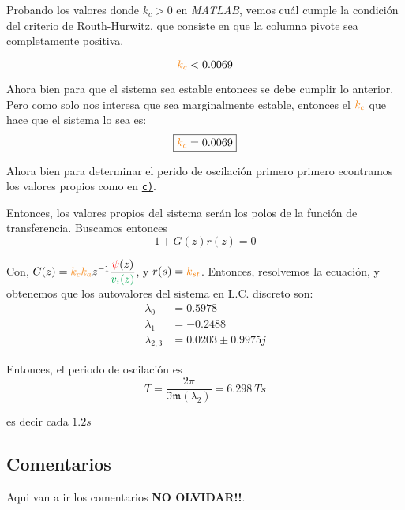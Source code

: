Probando los valores donde \( k_c > 0 \) en \textit{MATLAB}, vemos cuál cumple la condición del criterio de Routh-Hurwitz, que consiste en que la columna pivote sea completamente positiva.

\begin{equation}
    \nara{k_{c}}  < 0.0069
\end{equation}

Ahora bien para que el sistema sea estable entonces se debe cumplir lo anterior. Pero 
como solo nos interesa que sea marginalmente estable, entonces el $\nara{k_{c}}$
que hace que el sistema lo sea es:
\begin{equation}
    \boxed{\nara{k_c} = 0.0069}
\end{equation}

Ahora bien para determinar el perido de oscilación primero primero econtramos los valores propios como en  \hyperref[pregunta-c]{\texttt{c)}}.

Entonces, los valores propios del sistema serán los polos de la función de
transferencia. Buscamos entonces
\begin{equation}
  1 + G(z)r(z) = 0
\end{equation}

Con, $G(z) =  \nara{k_{c} k_{a}} z^{-1} \dfrac{\rojo{\psi}(z)}{\verd{v_{i}(z)}}$, y
$r(s) = \nara{k_{st}}$. Entonces, resolvemos la ecuación, y obtenemos que los
autovalores del sistema en L.C. discreto son:
\begin{align*}
  \lambda_{0} &= 0.5978\\
  \lambda_{1} &= -0.2488\\
  \lambda_{2,3} &= 0.0203 \pm 0.9975j
\end{align*}

Entonces, el periodo de oscilación es
\begin{equation}
    T = \frac{2\pi}{\mathfrak{Im}(\lambda_{2})} = 6.298\ \unit{T s} 
\end{equation}

es decir cada $1.2 \unit{s}$ 

\subsection{Comentarios}

Aqui van a ir los comentarios \textbf{NO OLVIDAR!!}.
